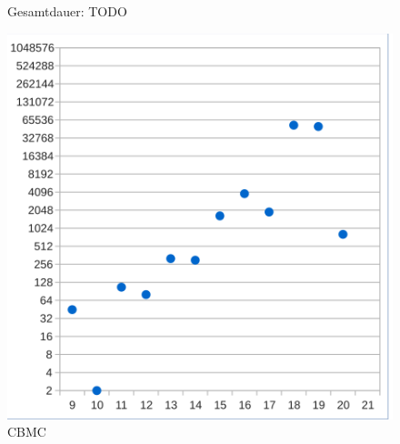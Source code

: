\begin{figure}[!h]
  \centering
  \begin{minipage}[t]{0.45\textwidth}
  \begin{flushleft}Gesamtdauer: TODO\end{flushleft}
  \includegraphics[scale=0.55]{images/eval_cbmc}
  \end{minipage}
  \caption{CBMC}
  \label{fig:eval_cbmc}
\end{figure}

